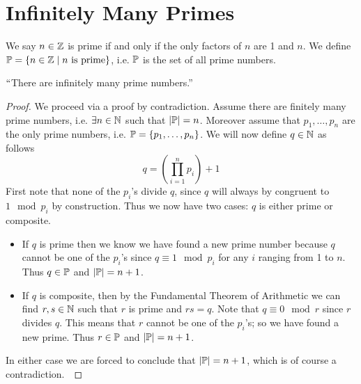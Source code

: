     \section{Infinitely Many Primes}
        \begin{definition}
            We say $n \in \mathbb{Z}$ is prime if and only if the only factors of $n$
            are 1 and $n$. We define $\mathbb{P} = \left\{n \in \mathbb{Z} \mid n \mbox{ is prime}\right\}$,
            i.e. $\mathbb{P}$ is the set of all prime numbers.
        \end{definition}
        \begin{theorem}
            $``$There are infinitely many prime numbers.''
            \label{Infinitely Many Primes}
        \end{theorem}
        \begin{proof}
            We proceed via a proof by contradiction. Assume there are finitely
            many prime numbers, i.e. $\exists n \in \mathbb{N}$ such that $|\mathbb{P}| = n$.
            Moreover assume that $p_1, \dots, p_n$ are the only prime numbers, i.e.
            $\mathbb{P} = \left\{p_1, \dots, p_n\right\}$. We will now define $q \in \mathbb{N}$ as
            follows
            \[
                q = \left(\prod_{i = 1}^n p_i\right) + 1
            \]
            First note that none of the $p_i$'s divide $q$, since $q$ will always by
            congruent to $1 \mod p_i$ by construction. Thus we now have two cases:
            $q$ is either prime or composite.
            \begin{itemize}
                \item
                    If $q$ is prime then we know we have found a new prime number because
                    $q$ cannot be one of the $p_i$'s since $q \equiv 1 \mod p_i$ for any
                    $i$ ranging from 1 to $n$. Thus $q \in \mathbb{P}$ and $|\mathbb{P}| = n + 1$. 
                \item
                    If $q$ is composite, then by the Fundamental Theorem of Arithmetic we
                    can find $r, s \in \mathbb{N}$ such that $r$ is prime and $rs = q$.
                    Note that $q \equiv 0 \mod r$ since $r$ divides $q$. This means
                    that $r$ cannot be one of the $p_i$'s; so we have found a new prime.
                    Thus $r \in \mathbb{P}$ and $|\mathbb{P}| = n + 1$.
            \end{itemize}
            In either case we are forced to conclude that $|\mathbb{P}| = n + 1$, which is of course
            a contradiction.~\QED
        \end{proof}
